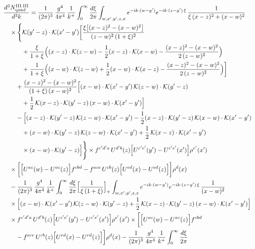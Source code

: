 \begingroup\small
\begin{align}\label{eq:H-III.III-2o}
&\frac{d^{3}N^{\rm III.III}_{{\rm quad}}}{d^{3}k}=\frac{1}{(2\pi)^{3}}\, \frac{g^{4}}{4\pi^{4}}\, \frac{1}{k^{+}} \int_{0}^{\infty}\frac{d\xi}{2\pi} \int_{w,x',y',z,x}e^{-ik\cdot(w-y')}e^{-ik\cdot(z-y')\,\xi}\, \frac{1}{\xi\,(x-z)^{2}+(x-w)^{2}}\notag\\
&\quad \times\Bigg\{\Kv(y'-z)\cdot\Kv(x'-y')\bigg[\frac{\xi\big[(x-z)^{2}-(x-w)^{2}\big]}{(z-w)^{2}\,(1+\xi)^{2}}\notag\\
&\quad\quad\quad +\frac{\xi}{1+\xi}\Big((x-z)\cdot\Kv(z-w)-\frac{1}{2}(x-z)\cdot\Kv(x-w)-\frac{(x-z)^{2}-(x-w)^{2}}{2\,(z-w)^{2}}\Big)\notag\\
&\quad\quad\quad +\frac{1}{1+\xi}\Big((x-w)\cdot\Kv(z-w)+\frac{1}{2}(x-w)\cdot\Kv(x-z)-\frac{(x-z)^{2}-(x-w)^{2}}{2\,(z-w)^{2}}\Big)\bigg]\notag\\
&\quad\quad +\frac{(x-z)^{2}-(x-w)^{2}}{(1+\xi)\,(x-w)^{2}}\Big[(x-w)\cdot\Kv(x'-y')\, \Kv(z-w)\cdot\Kv(y'-z)\notag\\
&\quad\quad\quad +\frac{1}{2}\, \Kv(x-z)\cdot\Kv(y'-z)\, (x-w)\cdot\Kv(x'-y')\Big]\notag\\
&\quad\quad -\Big[(x-z)\cdot\Kv(y'-z)\, \Kv(z-w)\cdot\Kv(x'-y') -\frac{1}{2}(x-z)\cdot\Kv(y'-z)\, \Kv(x-w)\cdot\Kv(x'-y')\notag\\
&\quad\quad\quad +(x-w)\cdot\Kv(y'-z)\, \Kv(z-w)\cdot\Kv(x'-y') +\frac{1}{2}\, \Kv(x-z)\cdot\Kv(x'-y')\notag\\
&\quad\quad\quad \times (x-w)\cdot\Kv(y'-z)\Big]\Bigg\} \times f^{c'd'a}\, U^{d'b}(z)\Big[U^{c'e'}(y')-U^{c'e'}(x')\Big]\rho^{e'}(x')\notag\\
&\quad \times\bigg[\Big[U^{ac}(w)-U^{ac}(z)\Big]f^{cbd} -f^{ace}\, U^{cb}(z)\Big[U^{ed}(x)-U^{ed}(z)\Big]\bigg]\rho^{d}(x)\notag\\
&\quad -\frac{1}{(2\pi)^{3}}\, \frac{g^{4}}{4\pi^{4}}\, \frac{1}{k^{+}} \int_{0}^{\infty}\frac{d\xi}{2\pi}\Big[\frac{1}{\xi\,(1+\xi)}\Big]_{+} \int_{w,x',y',z,x}e^{-ik\cdot(w-y')}e^{-ik\cdot(z-y')\,\xi}\, \frac{1}{(x-w)^{2}}\notag\\
&\quad \times\Big[(x-w)\cdot\Kv(x'-y')\, \Kv(z-w)\cdot\Kv(y'-z) +\frac{1}{2}\, \Kv(x-z)\cdot\Kv(y'-z)\, (x-w)\cdot\Kv(x'-y')\Big]\notag\\
&\quad \times f^{c'd'a}\, U^{d'b}(z)\Big[U^{c'e'}(y')-U^{c'e'}(x')\Big]\rho^{e'}(x') \times\bigg[\Big[U^{ac}(w)-U^{ac}(z)\Big]f^{cbd}\notag\\
&\quad\quad -f^{ace}\, U^{cb}(z)\Big[U^{ed}(x)-U^{ed}(z)\Big]\bigg]\rho^{d}(x) -\frac{1}{(2\pi)^{3}}\, \frac{g^{4}}{4\pi^{4}}\, \frac{1}{k^{+}} \int_{0}^{\infty}\frac{d\xi}{2\pi}\notag\\

\end{align}
